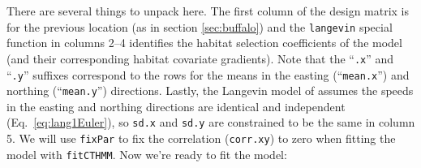 \documentclass[12pt]{article}\usepackage[]{graphicx}\usepackage[]{xcolor}
\begin{document}
\noindent There are several things to unpack here. The first column of the design matrix is for the previous location (as in section \ref{sec:buffalo}) and the \verb|langevin| special function in columns 2--4 identifies the habitat selection coefficients of the model (and their corresponding habitat covariate gradients). Note that the ``\verb|.x|'' and ``\verb|.y|'' suffixes correspond to the rows for the means in the easting (``\verb|mean.x|'') and northing (``\verb|mean.y|'') directions. Lastly, the Langevin model of \citet{MichelotEtAl2019} assumes the speeds in the easting and northing directions are identical and independent (Eq.\ \ref{eq:lang1Euler}), so \verb|sd.x| and \verb|sd.y| are constrained to be the same in column 5. We will use \verb|fixPar| to fix the correlation (\verb|corr.xy|) to zero when fitting the model with \verb|fitCTHMM|. Now we're ready to fit the model:
\end{document}
